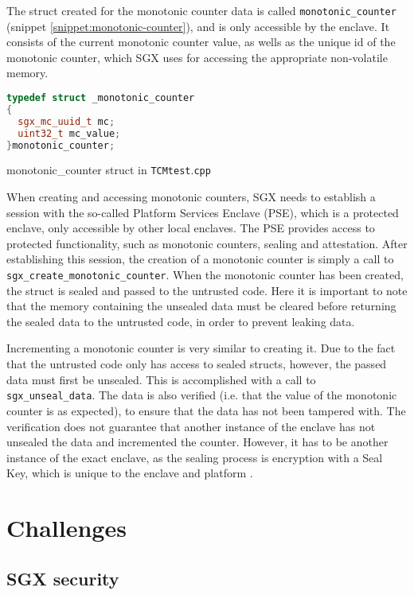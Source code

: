 \documentclass[12pt]{article}
\begin{document}
	The struct created for the monotonic counter data is called \texttt{monotonic\_counter} (snippet \ref{snippet:monotonic-counter}), and is only accessible by the enclave. It consists of the current monotonic counter value, as wells as the unique id of the monotonic counter, which SGX uses for accessing the appropriate non-volatile memory.
	\begin{snippet}[!ht]
		\begin{lstlisting}[language=C++, numbers=none]
typedef struct _monotonic_counter
{
  sgx_mc_uuid_t mc;
  uint32_t mc_value;
}monotonic_counter;
		\end{lstlisting}
		\caption{monotonic\_counter struct in \texttt{TCMtest$.$cpp} \label{snippet:monotonic-counter}}
	\end{snippet}

	When creating and accessing monotonic counters, SGX needs to establish a session with the so-called Platform Services Enclave (PSE), which is a protected enclave, only accessible by other local enclaves. 
	The PSE provides access to protected functionality, such as monotonic counters, sealing and attestation.
	After establishing this session, the creation of a monotonic counter is simply a call to \texttt{sgx\_create\_monotonic\_counter}.
	When the monotonic counter has been created, the struct is sealed and passed to the untrusted code. 
	Here it is important to note that the memory containing the unsealed data must be cleared before returning the sealed data to the untrusted code, in order to prevent leaking data.

	Incrementing a monotonic counter is very similar to creating it. 
	Due to the fact that the untrusted code only has access to sealed structs, however, the passed data must first be unsealed. 
	This is accomplished with a call to \texttt{sgx\_unseal\_data}. 
	The data is also verified (i.e. that the value of the monotonic counter is as expected), to ensure that the data has not been tampered with.
	The verification does not guarantee that another instance of the enclave has not unsealed the data and incremented the counter. 
	However, it has to be another instance of the exact enclave, as the sealing process is encryption with a Seal Key, which is unique to the enclave and platform \cite{sgx-dev-guide}.

	\section{Challenges}

		\subsection{SGX security}
\end{document}
